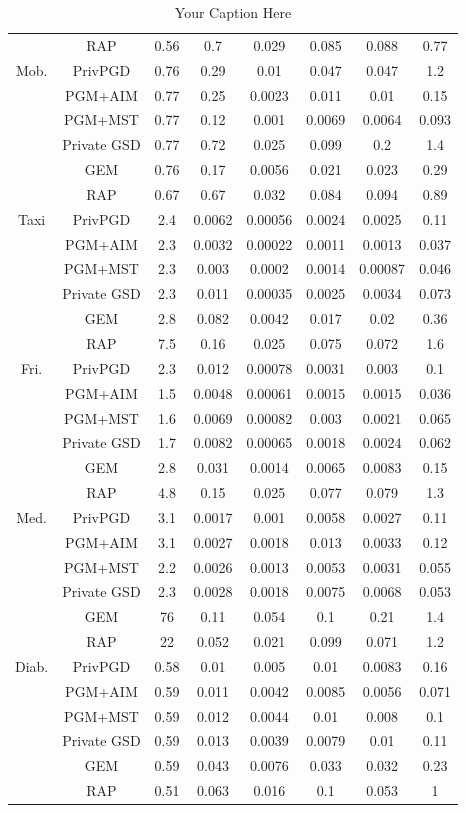 \begin{table*}[ht]
\begin{tabular}{cccccccc}
 & RAP&0.56 & 0.7 & 0.029 & 0.085 & 0.088 & 0.77 \\
\multirow{6}{*}{Mob. } & PrivPGD&0.76 & 0.29 & 0.01 & 0.047 & 0.047 & 1.2 \\
 & PGM+AIM&0.77 & 0.25 & 0.0023 & 0.011 & 0.01 & 0.15 \\
 & PGM+MST&0.77 & 0.12 & 0.001 & 0.0069 & 0.0064 & 0.093 \\
 & Private GSD&0.77 & 0.72 & 0.025 & 0.099 & 0.2 & 1.4 \\
 & GEM&0.76 & 0.17 & 0.0056 & 0.021 & 0.023 & 0.29 \\
 & RAP&0.67 & 0.67 & 0.032 & 0.084 & 0.094 & 0.89 \\
\multirow{6}{*}{Taxi } & PrivPGD&2.4 & 0.0062 & 0.00056 & 0.0024 & 0.0025 & 0.11 \\
 & PGM+AIM&2.3 & 0.0032 & 0.00022 & 0.0011 & 0.0013 & 0.037 \\
 & PGM+MST&2.3 & 0.003 & 0.0002 & 0.0014 & 0.00087 & 0.046 \\
 & Private GSD&2.3 & 0.011 & 0.00035 & 0.0025 & 0.0034 & 0.073 \\
 & GEM&2.8 & 0.082 & 0.0042 & 0.017 & 0.02 & 0.36 \\
 & RAP&7.5 & 0.16 & 0.025 & 0.075 & 0.072 & 1.6 \\
\multirow{6}{*}{Fri. } & PrivPGD&2.3 & 0.012 & 0.00078 & 0.0031 & 0.003 & 0.1 \\
 & PGM+AIM&1.5 & 0.0048 & 0.00061 & 0.0015 & 0.0015 & 0.036 \\
 & PGM+MST&1.6 & 0.0069 & 0.00082 & 0.003 & 0.0021 & 0.065 \\
 & Private GSD&1.7 & 0.0082 & 0.00065 & 0.0018 & 0.0024 & 0.062 \\
 & GEM&2.8 & 0.031 & 0.0014 & 0.0065 & 0.0083 & 0.15 \\
 & RAP&4.8 & 0.15 & 0.025 & 0.077 & 0.079 & 1.3 \\
\multirow{6}{*}{Med. } & PrivPGD&3.1 & 0.0017 & 0.001 & 0.0058 & 0.0027 & 0.11 \\
 & PGM+AIM&3.1 & 0.0027 & 0.0018 & 0.013 & 0.0033 & 0.12 \\
 & PGM+MST&2.2 & 0.0026 & 0.0013 & 0.0053 & 0.0031 & 0.055 \\
 & Private GSD&2.3 & 0.0028 & 0.0018 & 0.0075 & 0.0068 & 0.053 \\
 & GEM&76 & 0.11 & 0.054 & 0.1 & 0.21 & 1.4 \\
 & RAP&22 & 0.052 & 0.021 & 0.099 & 0.071 & 1.2 \\
\multirow{6}{*}{Diab. } & PrivPGD&0.58 & 0.01 & 0.005 & 0.01 & 0.0083 & 0.16 \\
 & PGM+AIM&0.59 & 0.011 & 0.0042 & 0.0085 & 0.0056 & 0.071 \\
 & PGM+MST&0.59 & 0.012 & 0.0044 & 0.01 & 0.008 & 0.1 \\
 & Private GSD&0.59 & 0.013 & 0.0039 & 0.0079 & 0.01 & 0.11 \\
 & GEM&0.59 & 0.043 & 0.0076 & 0.033 & 0.032 & 0.23 \\
 & RAP&0.51 & 0.063 & 0.016 & 0.1 & 0.053 & 1 \\
\bottomrule
\end{tabular}
\caption{Your Caption Here}
\end{table*}
